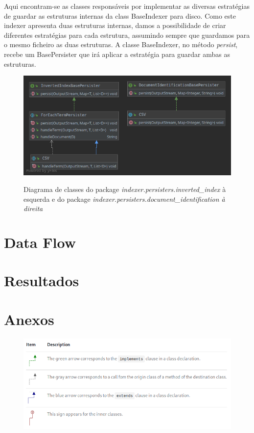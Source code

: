 \documentclass[12pt]{article}
\begin{document}
Aqui encontram-se as classes responsáveis por implementar as diversas
estratégias de guardar as estruturas internas da class BaseIndexer
para disco. Como este indexer apresenta duas estruturas internas,
damos a possibilidade de criar diferentes estratégias para cada
estrutura, assumindo sempre que guardamos para o mesmo ficheiro as
duas estruturas. A classe BaseIndexer, no método {\it persist},
recebe um BasePersister que irá aplicar a estratégia para guardar
ambas as estruturas.

\begin{figure}[h]
  \center
  \includegraphics[width=16cm]{packages_indexer_persisters_impl.png}
  \label{fig:packages_indexer_structures}
    \caption{Diagrama de classes do package {\it indexer.persisters.inverted\_index}
    à esquerda e do package \it indexer.persisters.document\_identification
    à direita}
\end{figure}

\section{Data Flow}

\section{Resultados}
\section{Anexos}

\begin{figure}[h]
  \center
  \includegraphics[width=16cm]{arrow_legend.png}
\end{figure}
\end{document}
